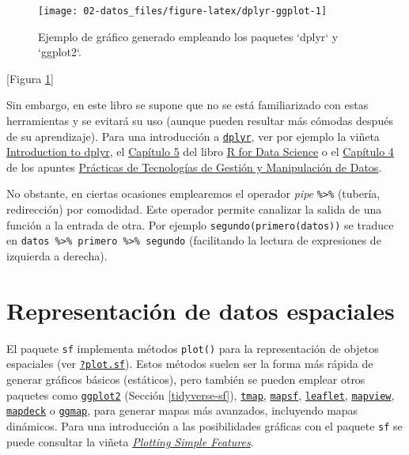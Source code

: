 \documentclass[
  spanish,
]{book}
\theoremstyle{break}
\theoremstyle{definition}
\theoremstyle{definition}
\theoremstyle{definition}
\theoremstyle{definition}
\theoremstyle{remark}
\begin{document}
\begin{figure}[!htb]

{\centering \texttt{[image: 02-datos\_files/figure-latex/dplyr-ggplot-1]} 

}

\caption{Ejemplo de gráfico generado empleando los paquetes `dplyr` y `ggplot2`.}\label{fig:dplyr-ggplot}
\end{figure}

{[}Figura \ref{fig:dplyr-ggplot}{]}

Sin embargo, en este libro se supone que no se está familiarizado con estas herramientas y se evitará su uso (aunque pueden resultar más cómodas después de su aprendizaje).
Para una introducción a \href{https://dplyr.tidyverse.org}{\texttt{dplyr}}, ver por ejemplo la viñeta \href{https://cran.rstudio.com/web/packages/dplyr/vignettes/dplyr.html}{Introduction to dplyr},
el \href{http://r4ds.had.co.nz/transform.html}{Capítulo 5} del libro \href{http://r4ds.had.co.nz}{R for Data Science} o el \href{https://gltaboada.github.io/tgdbook/dplyr.html}{Capítulo 4} de los apuntes \href{https://gltaboada.github.io/tgdbook}{Prácticas de Tecnologías de Gestión y Manipulación de Datos}.

No obstante, en ciertas ocasiones emplearemos el operador \emph{pipe} \texttt{\%\textgreater{}\%} (tubería, redirección) por comodidad.
Este operador permite canalizar la salida de una función a la entrada de otra.
Por ejemplo \texttt{segundo(primero(datos))} se traduce en \texttt{datos\ \%\textgreater{}\%\ primero\ \%\textgreater{}\%\ segundo}
(facilitando la lectura de expresiones de izquierda a derecha).

\hypertarget{sf-plot}{%
\section{Representación de datos espaciales}\label{sf-plot}}

El paquete \texttt{sf} implementa métodos \texttt{plot()} para la representación de objetos espaciales (ver \href{https://r-spatial.github.io/sf/reference/plot.html}{\texttt{?plot.sf}}).
Estos métodos suelen ser la forma más rápida de generar gráficos básicos (estáticos), pero también se pueden emplear otros paquetes como \href{https://ggplot2.tidyverse.org}{\texttt{ggplot2}} (Sección \ref{tidyverse-sf}), \href{https://r-tmap.github.io/tmap}{\texttt{tmap}}, \href{https://riatelab.github.io/mapsf}{\texttt{mapsf}}, \href{https://rstudio.github.io/leaflet}{\texttt{leaflet}}, \href{https://r-spatial.github.io/mapview}{\texttt{mapview}}, \href{https://symbolixau.github.io/mapdeck}{\texttt{mapdeck}} o \href{https://github.com/dkahle/ggmap}{\texttt{ggmap}}, para generar mapas más avanzados, incluyendo mapas dinámicos.
Para una introducción a las posibilidades gráficas con el paquete \texttt{sf} se puede consultar la viñeta \href{https://r-spatial.github.io/sf/articles/sf5.html}{\emph{Plotting Simple Features}}.
\end{document}
